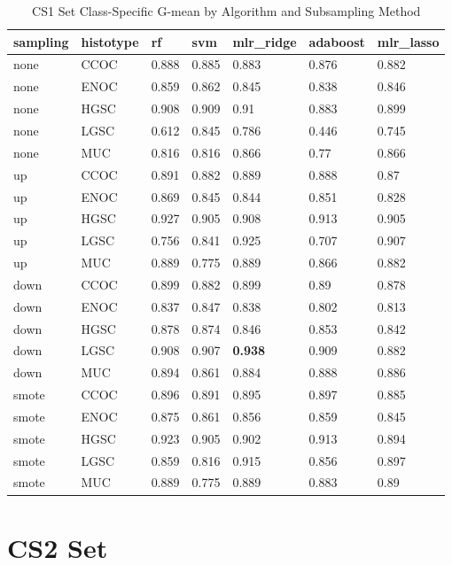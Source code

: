 \documentclass[
]{report}
\begin{document}
\begin{table}

\caption{\label{tab:cs1-gmean-class-table}CS1 Set Class-Specific G-mean by Algorithm and Subsampling Method}
\centering
\begin{tabular}[t]{l|l|l|l|l|l|l}
\hline
sampling & histotype & rf & svm & mlr\_ridge & adaboost & mlr\_lasso\\
\hline
none & CCOC & 0.888 & 0.885 & 0.883 & 0.876 & 0.882\\
\hline
none & ENOC & 0.859 & 0.862 & 0.845 & 0.838 & 0.846\\
\hline
none & HGSC & 0.908 & 0.909 & 0.91 & 0.883 & 0.899\\
\hline
none & LGSC & 0.612 & 0.845 & 0.786 & 0.446 & 0.745\\
\hline
none & MUC & 0.816 & 0.816 & 0.866 & 0.77 & 0.866\\
\hline
up & CCOC & 0.891 & 0.882 & 0.889 & 0.888 & 0.87\\
\hline
up & ENOC & 0.869 & 0.845 & 0.844 & 0.851 & 0.828\\
\hline
up & HGSC & 0.927 & 0.905 & 0.908 & 0.913 & 0.905\\
\hline
up & LGSC & 0.756 & 0.841 & 0.925 & 0.707 & 0.907\\
\hline
up & MUC & 0.889 & 0.775 & 0.889 & 0.866 & 0.882\\
\hline
down & CCOC & 0.899 & 0.882 & 0.899 & 0.89 & 0.878\\
\hline
down & ENOC & 0.837 & 0.847 & 0.838 & 0.802 & 0.813\\
\hline
down & HGSC & 0.878 & 0.874 & 0.846 & 0.853 & 0.842\\
\hline
down & LGSC & 0.908 & 0.907 & \textbf{0.938} & 0.909 & 0.882\\
\hline
down & MUC & 0.894 & 0.861 & 0.884 & 0.888 & 0.886\\
\hline
smote & CCOC & 0.896 & 0.891 & 0.895 & 0.897 & 0.885\\
\hline
smote & ENOC & 0.875 & 0.861 & 0.856 & 0.859 & 0.845\\
\hline
smote & HGSC & 0.923 & 0.905 & 0.902 & 0.913 & 0.894\\
\hline
smote & LGSC & 0.859 & 0.816 & 0.915 & 0.856 & 0.897\\
\hline
smote & MUC & 0.889 & 0.775 & 0.889 & 0.883 & 0.89\\
\hline
\end{tabular}
\end{table}

\hypertarget{cs2-set}{%
\section{CS2 Set}\label{cs2-set}}
\end{document}

